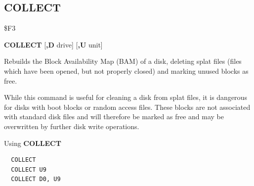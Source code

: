 \subsection{COLLECT}
\begin{description}[leftmargin=2cm,style=nextline]
\item [Token:] \$F3
\item [Format:] {\bf COLLECT} [{\bf,D} drive] [{\bf,U} unit]
\item [Usage:]
   Rebuilds the Block Availability Map (BAM)
   of a disk, deleting splat files (files which have been opened,
   but not properly closed) and marking unused blocks as free.

   \drivedefinition

   \unitdefinition

\item [Remarks:]
   While this command is useful for cleaning a disk from
   splat files, it is dangerous for disks with boot blocks or random access files.
   These blocks are not associated with standard disk files
   and will therefore be marked as free and may be overwritten
   by further disk write operations.


\item [Examples:] Using {\bf COLLECT}
\begin{tcolorbox}[colback=black,coltext=white]
\verbatimfont{\codefont}
\begin{verbatim}
  COLLECT
  COLLECT U9
  COLLECT D0, U9
\end{verbatim}
\end{tcolorbox}
\end{description}


\newpage
